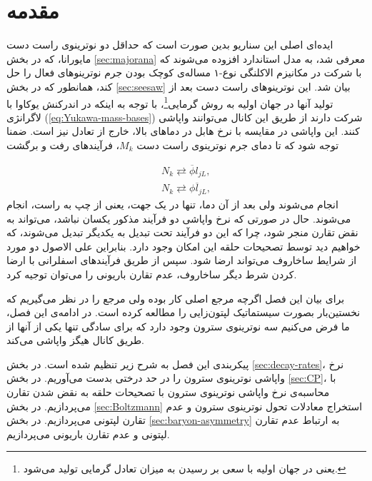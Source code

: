 \documentclass[a4paper]{book}
\begin{document}
\section{مقدمه}
ایده‌ای اصلی این سناریو بدین صورت است که حداقل دو نوترینوی راست دست مایورانا، که در بخش \ref{sec:majorana} معرفی شد، به مدل استاندارد افزوده می‌شوند که با شرکت در مکانیزم الاکلنگی نوع-۱ مساله‌ی کوچک بودن جرم نوترینوهای فعال را حل کند، همانطور که در بخش \ref{sec:seesaw} بیان شد. این نوترینوهای راست دست بعد از تولید آنها در جهان اولیه به روش گرمایی\footnote{یعنی در جهان اولیه با سعی بر رسیدن به میزان تعادل گرمایی تولید می‌شود.}، با توجه به اینکه در اندرکنش یوکاوا با لاگرانژی (\ref{eq:Yukawa-mass-bases}) شرکت دارند از طریق این کانال می‌توانند واپاشی کنند. این واپاشی در مقایسه با نرخ هابل در دما‌های بالا، خارج از تعادل نیز است. ضمنا توجه شود که تا دمای جرم نوترینوی راست دست {\footnotesize$M_k$}، فرآیند‌های رفت و برگشت
\par
\vspace{-0.5cm}
{\footnotesize\begin{align}
	N_k \rightleftarrows \overline{\phi} l_{jL},
	\label{eq:decay}\\
	N_k \rightleftarrows \phi \overline{l}_{jL},
	\label{eq:decay-anti}
\end{align}}
انجام می‌شوند ولی بعد از آن دما، تنها در یک جهت، یعنی از چپ به راست، انجام می‌شوند. حال در صورتی که نرخ واپاشی دو فرآیند مذکور یکسان نباشد، می‌تواند به نقض تقارن  منجر شود، چرا که این دو فرآیند تحت تبدیل  به یکدیگر تبدیل می‌شوند، که خواهیم دید توسط تصحیحات حلقه این امکان وجود دارد. بنابراین علی الاصول دو مورد از شرایط ساخاروف می‌تواند ارضا شود.
سپس از طریق  فرآیندهای اسفلرانی با ارضا کردن شرط دیگر ساخاروف، عدم تقارن باریونی را می‌توان توجیه کرد.

برای بیان این فصل اگرچه مرجع اصلی کار \cite{Fukugita:1986hr} بوده ولی مرجع \cite{Luty:1992un} را در نظر می‌گیریم که نخستین‌بار بصورت سیستماتیک لپتون‌زایی را مطالعه کرده است.
در ادامه‌ی این فصل، ما فرض می‌کنیم سه نوترینوی سترون وجود دارد که برای سادگی تنها یکی از آنها از طریق کانال هیگز واپاشی می‌کند. 

پیکربندی این فصل به شرح زیر تنظیم شده است. در بخش \ref{sec:decay-rates}، نرخ واپاشی نوترینوی سترون را در حد درختی بدست می‌آوریم. در بخش \ref{sec:CP}، با محاسبه‌ی نرخ واپاشی نوترینوی سترون با تصحیحات حلقه به نقض شدن تقارن  می‌پردازیم. در بخش \ref{sec:Boltzmann} استخراج معادلات تحول نوترینوی سترون و عدم تقارن لپتونی می‌پردازیم. در بخش \ref{sec:baryon-asymmetry} به ارتباط عدم تقارن لپتونی و عدم تقارن باریونی می‌پردازیم.
\end{document}
